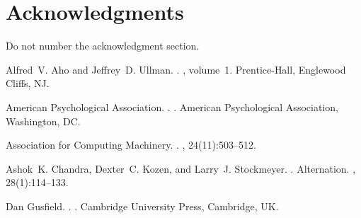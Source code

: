 \documentclass[11pt,letterpaper]{article}
\begin{document}
\section*{Acknowledgments}

Do not number the acknowledgment section.

\begin{thebibliography}{}


Alfred~V. Aho and Jeffrey~D. Ullman.
.
, volume~1.
\newblock Prentice-{Hall}, Englewood Cliffs, NJ.

{American Psychological Association}.
.
.
\newblock American Psychological Association, Washington, DC.

{Association for Computing Machinery}.
.
, 24(11):503--512.

Ashok~K. Chandra, Dexter~C. Kozen, and Larry~J. Stockmeyer.
.
\newblock Alternation.
,
  28(1):114--133.

Dan Gusfield.
.
.
\newblock Cambridge University Press, Cambridge, UK.

\end{thebibliography}
\end{document}

